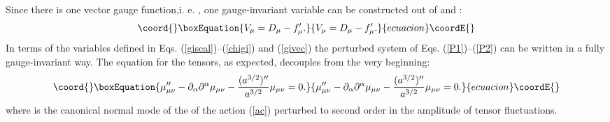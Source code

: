 \documentclass[a4paper,12pt]{article}
\begin{document}
Since there is one vector gauge function,i. e. \myHighlight{$\zeta_{\mu}$}\coordHE{}, 
one gauge-invariant variable 
can be constructed out of \coordHE{} and \coordHE{}:
\begin{equation}\coord{}\boxEquation{
V_{\mu} = D_{\mu} - f_{\mu}'.
\label{givec}
}{
V_{\mu} = D_{\mu} - f_{\mu}'.
}{ecuacion}\coordE{}\end{equation}
In terms of the variables defined in Eqs. (\ref{giscal})--(\ref{chigi}) 
and (\ref{givec}) the perturbed system of Eqs. (\ref{P1})--(\ref{P2}) 
can be written in a fully gauge-invariant way. The equation for the 
tensors, as expected, decouples from the very beginning:
\begin{equation}\coord{}\boxEquation{
\mu_{\mu\nu}'' - \partial_{\alpha}\partial^{\alpha} \mu_{\mu\nu} 
- \frac{(a^{3/2})''}{a^{3/2}} \mu_{\mu\nu} =0.
\label{mu}
}{
\mu_{\mu\nu}'' - \partial_{\alpha}\partial^{\alpha} \mu_{\mu\nu} 
- \frac{(a^{3/2})''}{a^{3/2}} \mu_{\mu\nu} =0.
}{ecuacion}\coordE{}\end{equation}
where \coordHE{} is the canonical 
normal mode of the of the action (\ref{ac}) perturbed to second order 
in the amplitude of tensor fluctuations.
\end{document}
